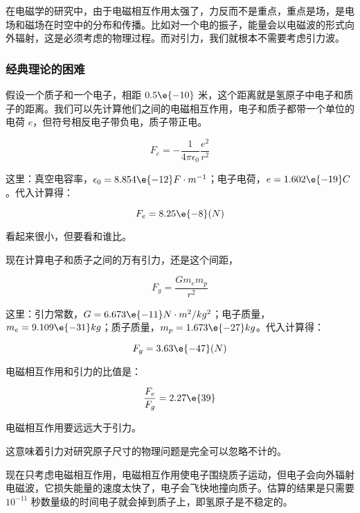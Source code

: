 在电磁学的研究中，由于电磁相互作用太强了，力反而不是重点，重点是场，是电场和磁场在时空中的分布和传播。比如对一个电的振子，能量会以电磁波的形式向外辐射，这是必须考虑的物理过程。而对引力，我们就根本不需要考虑引力波。

\subsubsection{经典理论的困难}

假设一个质子和一个电子，相距 $0.5\e{-10}$ 米，这个距离就是氢原子中电子和质子的距离。我们可以先计算他们之间的电磁相互作用，电子和质子都带一个单位的电荷 $e$，但符号相反电子带负电，质子带正电。

\begin{equation}
F_e = - \frac{1}{4 \pi \epsilon_0}\frac{e^2 }{r^2 }
\end{equation}

这里：真空电容率，$\epsilon_0 = 8.854\e{-12} F \cdot m^{-1}$；电子电荷，$e = 1.602\e{-19} C$。代入计算得：

\begin{equation}
F_e = 8.25\e{-8} (N)
\end{equation}

看起来很小，但要看和谁比。

现在计算电子和质子之间的万有引力，还是这个间距，

\begin{equation}
F_g = \frac{G m_e m_p }{r^2}
\end{equation}

这里：引力常数，$G = 6.673\e{-11} N \cdot m^2 / kg^2 $；电子质量，$m_e = 9.109\e{-31} kg $；质子质量，$m_p = 1.673 \e{-27 } kg  $。代入计算得：

\begin{equation}
F_g = 3.63\e{-47} (N)
\end{equation}


电磁相互作用和引力的比值是：

\begin{equation}
\frac{F_e}{ F_g } = 2.27\e{39}
\end{equation}

电磁相互作用要远远大于引力。

这意味着引力对研究原子尺寸的物理问题是完全可以忽略不计的。

现在只考虑电磁相互作用，电磁相互作用使电子围绕质子运动，但电子会向外辐射电磁波，它损失能量的速度太快了，电子会飞快地撞向质子。估算的结果是只需要 $10^{-11}$ 秒数量级的时间电子就会掉到质子上，即氢原子是不稳定的。


